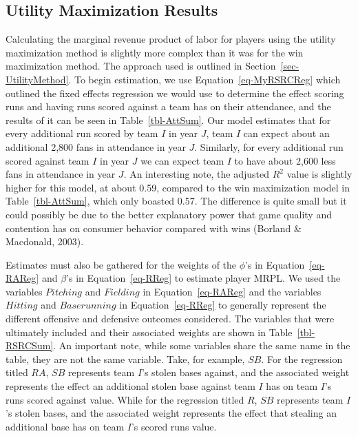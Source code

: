 \documentclass[
  12pt,
  letterpaper,
  DIV=11,
  numbers=noendperiod]{scrartcl}
\begin{document}
\hypertarget{sec-UtilityResults}{%
\subsection{Utility Maximization Results}\label{sec-UtilityResults}}

Calculating the marginal revenue product of labor for players using the
utility maximization method is slightly more complex than it was for the
win maximization method. The approach used is outlined in
Section~\ref{sec-UtilityMethod}. To begin estimation, we use
Equation~\ref{eq-MyRSRCReg} which outlined the fixed effects regression
we would use to determine the effect scoring runs and having runs scored
against a team has on their attendance, and the results of it can be
seen in Table~\ref{tbl-AttSum}. Our model estimates that for every
additional run scored by team \(I\) in year \(J\), team \(I\) can expect
about an additional 2,800 fans in attendance in year \(J\). Similarly,
for every additional run scored against team \(I\) in year \(J\) we can
expect team \(I\) to have about 2,600 less fans in attendance in year
\(J\). An interesting note, the adjusted \(R^2\) value is slightly
higher for this model, at about 0.59, compared to the win maximization
model in Table~\ref{tbl-AttSum}, which only boasted 0.57. The difference
is quite small but it could possibly be due to the better explanatory
power that game quality and contention has on consumer behavior compared
with wins (Borland \& Macdonald, 2003).

Estimates must also be gathered for the weights of the \(\phi\)'s in
Equation~\ref{eq-RAReg} and \(\beta\)'s in Equation~\ref{eq-RReg} to
estimate player MRPL. We used the variables \(Pitching\) and
\(Fielding\) in Equation~\ref{eq-RAReg} and the variables \(Hitting\)
and \(Baserunning\) in Equation~\ref{eq-RReg} to generally represent the
different offensive and defensive outcomes considered. The variables
that were ultimately included and their associated weights are shown in
Table~\ref{tbl-RSRCSum}. An important note, while some variables share
the same name in the table, they are not the same variable. Take, for
example, \(SB\). For the regression titled \(RA\), \(SB\) represents
team \(I\)'s stolen bases against, and the associated weight represents
the effect an additional stolen base against team \(I\) has on team
\(I\)'s runs scored against value. While for the regression titled
\(R\), \(SB\) represents team \(I\)'s stolen bases, and the associated
weight represents the effect that stealing an additional base has on
team \(I\)'s scored runs value.
\end{document}
